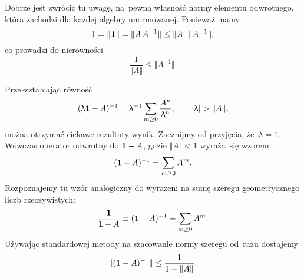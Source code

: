 \documentclass[a4paper,11pt]{article}
\begin{document}
\vspace{\VerSpaceFour}





\noindent
{} Dobrze jest zwrócić tu uwagę, na~pewną własność normy elementu
odwrotnego, która zachodzi dla każdej algebry unormowanej. Ponieważ mamy
\begin{equation}
  \label{eq:Bratteli-Robinson-Operator-Algebras-ETC-Vol-I-s01-26}
  1 = \Vert \mathbf{1} \Vert = \Vert A \, A^{ -1 } \Vert \leq \Vert A \Vert \, \Vert A^{ -1 } \Vert,
\end{equation}
co prowadzi do nierówności
\begin{equation}
  \label{eq:Bratteli-Robinson-Operator-Algebras-ETC-Vol-I-s01-27}
  \frac{ 1 }{ \Vert A \Vert } \leq \Vert A^{ -1 } \Vert.
\end{equation}

\vspace{\VerSpaceFour}





\noindent
{} Przekształcając równość
\begin{equation}
  \label{eq:Bratteli-Robinson-Operator-Algebras-ETC-Vol-I-s01-28}
  ( \uplambda \mathbf{1} - A )^{ -1 } =
  \uplambda^{ -1 } \sum_{ m \geq 0 } \frac{ A^{ n } }{ \uplambda^{ n } }, \qquad
  | \uplambda | > \Vert A \Vert,
\end{equation}
można otrzymać ciekawe rezultaty wynik. Zacznijmy od przyjęcia,
że~$\lambda = 1$. Wówczas operator odwrotny do $\mathbf{1} - A$, gdzie $\Vert A \Vert < 1$
wyraża~się wzorem
\begin{equation}
  \label{eq:Bratteli-Robinson-Operator-Algebras-ETC-Vol-I-s01-29}
  ( \mathbf{1} - A )^{ -1 } = \sum_{ m \geq 0 } A^{ m }.
\end{equation}
Rozpoznajemy tu wzór analogiczny do wyrażeni na sumę szeregu geometrycznego
liczb rzeczywistych:
\begin{equation}
  \label{eq:Bratteli-Robinson-Operator-Algebras-ETC-Vol-I-s01-30}
  \frac{ \mathbf{1} }{ \mathbf{1} - A } \equiv ( \mathbf{1} - A )^{ -1 } =
  \sum_{ m \geq 0 } A^{ m }.
\end{equation}
Używając standardowej metody na szacowanie normy szeregu od~razu dostajemy
\begin{equation}
  \label{eq:Bratteli-Robinson-Operator-Algebras-ETC-Vol-I-s01-31}
  \Vert ( \mathbf{1} - A )^{ -1 } \Vert \leq
  \frac{ 1 }{ 1 - \Vert A \Vert }.
\end{equation}
\end{document}
